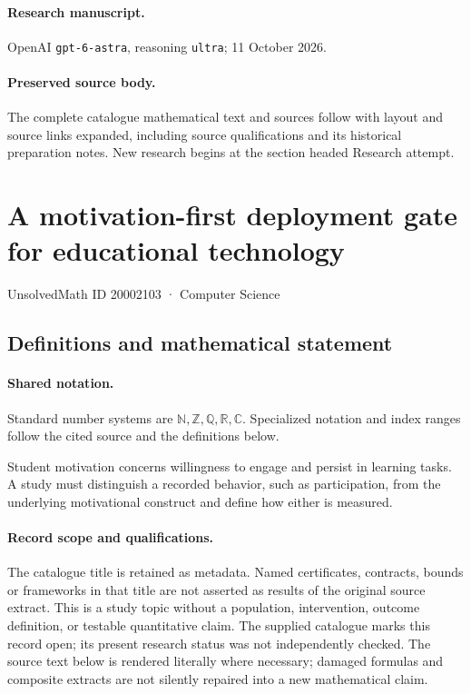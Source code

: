 \documentclass[11pt]{article}
\begin{document}
\paragraph{Research manuscript.} OpenAI \texttt{gpt-6-astra}, reasoning \texttt{ultra}; 11 October 2026.
\paragraph{Preserved source body.} The complete catalogue mathematical text and sources follow with layout and source links expanded, including source qualifications and its historical preparation notes. New research begins at the section headed Research attempt.

\section{A motivation-first deployment gate for educational technology}\label{20002103}
{\small UnsolvedMath ID 20002103 · Computer Science}
\subsection{Definitions and mathematical statement}

\paragraph{Shared notation.}Standard number systems are $\mathbb N,\mathbb Z,\mathbb Q,\mathbb R,\mathbb C$. Specialized notation and index ranges follow the cited source and the definitions below.


Student motivation concerns willingness to engage and persist in learning tasks. A study must distinguish a recorded behavior, such as participation, from the underlying motivational construct and define how either is measured.
\paragraph{Record scope and qualifications.}
The catalogue title is retained as metadata. Named certificates, contracts, bounds or frameworks in that title are not asserted as results of the original source extract.
This is a study topic without a population, intervention, outcome definition, or testable quantitative claim. The supplied catalogue marks this record open; its present research status was not independently checked.
The source text below is rendered literally where necessary; damaged formulas and composite extracts are not silently repaired into a new mathematical claim.
\end{document}
